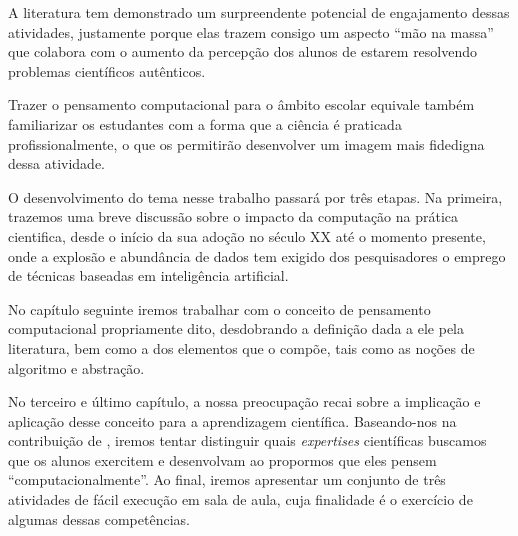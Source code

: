 A literatura tem demonstrado um surpreendente potencial de engajamento dessas atividades, justamente porque elas trazem consigo um aspecto ``mão na massa'' que colabora com o aumento da percepção dos alunos de estarem resolvendo problemas científicos autênticos.

Trazer o pensamento computacional para o âmbito escolar equivale também familiarizar os  estudantes com a forma que a ciência é praticada profissionalmente, o que os permitirão  desenvolver um imagem mais fidedigna dessa atividade.   

O desenvolvimento do tema nesse trabalho passará por três etapas. Na primeira, trazemos uma breve discussão sobre o impacto da computação na prática cientifica, desde o início da sua adoção no século XX até o momento presente, onde a explosão e abundância de dados tem exigido dos pesquisadores o emprego de técnicas baseadas em inteligência artificial.

No capítulo seguinte iremos trabalhar com o conceito de pensamento computacional propriamente dito, desdobrando a definição dada a ele pela literatura, bem como a dos elementos que o compõe, tais como as noções de algoritmo e abstração.

No terceiro e último capítulo, a nossa preocupação recai sobre a implicação e aplicação desse conceito para a aprendizagem científica. Baseando-nos na contribuição de , iremos tentar distinguir quais \textit{expertises} científicas buscamos que os alunos exercitem e desenvolvam ao propormos que eles pensem ``computacionalmente''. Ao final, iremos apresentar um conjunto de três atividades de fácil execução em sala de aula, cuja finalidade é o exercício de algumas dessas competências. 
















